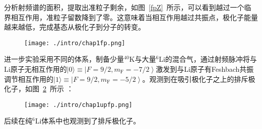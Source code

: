 分析射频谱的面积，提取出准粒子剩余，如图~\ref{fpZ}~所示，可以看到越过一个临界相互作用，准粒子留数降到了零。这意味着当相互作用越过共振点，极化子能量越来越低，完成基态从极化子到分子的转变。
\begin{figure}[!htbp]
    \centering
    \texttt{[image: ./intro/chap1fp.png]}
    \label{fp}
\end{figure}
进一步实验\cite{kohstall2012metastability}采用不同的体系，制备少量${}^{40}$K与大量${}^{6}$Li的混合气，通过射频脉冲将与Li原子无相互作用的$|0\rangle\equiv\left|F=9 / 2, m_{\mathrm{F}}=-7 / 2\right\rangle$激发到与Li原子有Feshbach共振调节相互作用的$|1\rangle \equiv\left|F=9 / 2, m_{\mathrm{F}}=-5 / 2\right\rangle$。观测到在吸引极化子之上的排斥极化子，如图~\ref{upfp}~所示 ：
\begin{figure}[!htbp]
    \centering
    \texttt{[image: ./intro/chap1upfp.png]}
    \label{upfp}
\end{figure}
后续在纯${}^{6}$Li体系中也观测到了排斥极化子\cite{Scazzarepulsive}。

